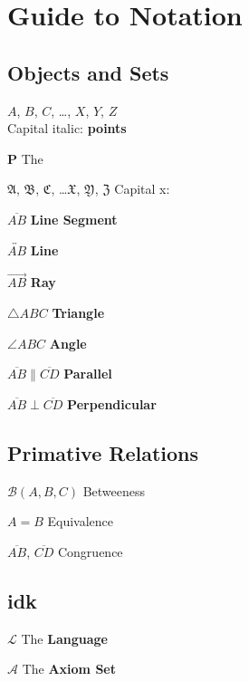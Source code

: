 \documentclass[../main.tex]{subfiles}
\begin{document}
\chapter*{Guide to Notation}

\section*{Objects and Sets}

$A$, $B$, $C$, \dots, $X$, $Y$, $Z$ \\
Capital italic: \textbf{points}

$\mathbf{P}$ The 

$\mathfrak{A}$, $\mathfrak{B}$, $\mathfrak{C}$, \dots $\mathfrak{X}$, $\mathfrak{Y}$, $\mathfrak{Z}$
Capital x: 

$\overline{AB}$ \textbf{Line Segment}

$\overleftrightarrow{AB}$ \textbf{Line}

$\overrightarrow{AB}$ \textbf{Ray}

$\triangle ABC$ \textbf{Triangle}

$\angle ABC$ \textbf{Angle}

$\overline{AB} \parallel \overline{CD}$ \textbf{Parallel}

$\overline{AB} \perp \overline{CD}$ \textbf{Perpendicular}

\section{Primative Relations}

$\mathcal{B}(A, B, C)$ Betweeness

$A = B$ Equivalence

$\overline{AB}$, $\overline{CD}$ Congruence

\section{idk}

$\mathcal{L}$ The \textbf{Language}

$\mathcal{A}$ The \textbf{Axiom Set}
\end{document}
